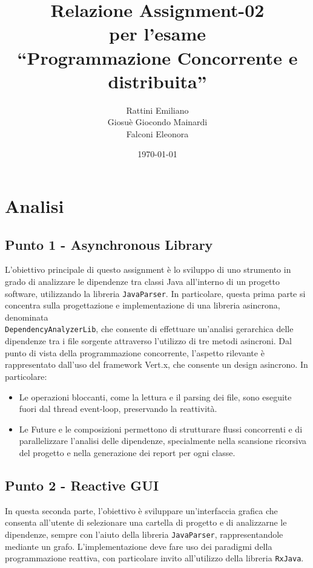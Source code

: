 \documentclass[a4paper,12pt]{report}
\title{Relazione Assignment-02 \\ per l'esame \\ ``Programmazione Concorrente e distribuita''}
\author{Rattini Emiliano\\Giosuè Giocondo Mainardi\\Falconi Eleonora}
\date{\today}
\begin{document}
    \maketitle

    \tableofcontents

    \chapter{Analisi}
    \section{Punto 1 - Asynchronous Library}

    L'obiettivo principale di questo assignment è lo sviluppo di uno strumento in grado di analizzare le dipendenze tra
    classi Java all'interno di un progetto software, utilizzando la libreria \texttt{JavaParser}. In particolare, questa prima parte si concentra sulla progettazione
    e implementazione di una libreria asincrona, denominata \\ \texttt{DependencyAnalyzerLib}, che consente di effettuare
    un'analisi gerarchica delle dipendenze tra i file sorgente attraverso l'utilizzo di tre metodi asincroni.
    Dal punto di vista della programmazione concorrente, l’aspetto rilevante è rappresentato dall’uso del framework Vert.x,
    che consente un design asincrono. In particolare:
    \begin{itemize}
        \item Le operazioni bloccanti, come la lettura e il parsing dei file, sono eseguite fuori dal thread event-loop, preservando la reattività.
        \item Le Future e le composizioni permettono di strutturare flussi concorrenti e di parallelizzare l’analisi delle dipendenze, specialmente nella scansione ricorsiva del progetto e nella generazione dei report per ogni classe.
    \end{itemize}

    \section{Punto 2 - Reactive GUI}

    In questa seconda parte, l'obiettivo è sviluppare un'interfaccia grafica che consenta all'utente di selezionare una cartella di progetto e di analizzarne le dipendenze, sempre con l'aiuto della libreria \texttt{JavaParser}, rappresentandole mediante un grafo.  
    L'implementazione deve fare uso dei paradigmi della programmazione reattiva, con particolare invito all'utilizzo della libreria \texttt{RxJava}.
\end{document}

